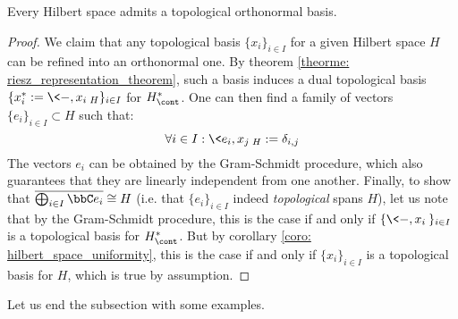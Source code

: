         \begin{definition}
            
        \end{definition}
        \begin{corollary} \label{coro: orthonormal_bases_for_hilbert_spaces}
            Every Hilbert space admits a topological orthonormal basis.
        \end{corollary}
            \begin{proof}
                We claim that any topological basis $\{x_i\}_{i \in I}$ for a given Hilbert space $H$ can be refined into an orthonormal one. By theorem \ref{theorme: riesz_representation_theorem}, such a basis induces a dual topological basis $\{x_i^* := \<-, x_i\>_H\}_{i \in I}$ for $H^*_{\cont}$. One can then find a family of vectors $\{e_i\}_{i \in I} \subset H$ such that:
                    $$\forall i \in I: \<e_i, x_j\>_H := \delta_{i, j}$$
                The vectors $e_i$ can be obtained by the Gram-Schmidt procedure, which also guarantees that they are linearly independent from one another. Finally, to show that $\overline{\bigoplus_{i \in I} \bbC e_i} \cong H$ (i.e. that $\{e_i\}_{i \in I}$ indeed \textit{topological} spans $H$), let us note that by the Gram-Schmidt procedure, this is the case if and only if $\{\<-, x_i\>\}_{i \in I}$ is a topological basis for $H^*_{\cont}$. But by corollary \ref{coro: hilbert_space_uniformity}, this is the case if and only if $\{x_i\}_{i \in I}$ is a topological basis for $H$, which is true by assumption.
            \end{proof}

        Let us end the subsection with some examples. 
        \begin{example}
            
        \end{example}
        \begin{example}
            
        \end{example}
